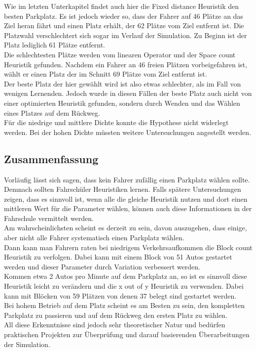 Wie im letzten Unterkapitel findet auch hier die Fixed distance Heuristik den besten Parkplatz.
Es ist jedoch wieder so, dass der Fahrer auf 46 Plätze an das Ziel heran fährt und einen Platz erhält, der 62 Plätze vom Ziel entfernt ist. Die Platzwahl verschlechtert sich sogar im Verlauf der Simulation. Zu Beginn ist der Platz lediglich 61 Plätze entfernt.\\
Die schlechtesten Plätze werden vom linearen Operator %
und der Space count Heuristik gefunden.
Nachdem ein Fahrer an 46 freien Plätzen vorbeigefahren ist, wählt er einen Platz der im Schnitt 69 Plätze vom Ziel entfernt ist.\\

Der beste Platz der hier gewählt wird ist also etwas schlechter, als im Fall von wenigen Lernenden. Jedoch wurde in diesen Fällen der beste Platz auch nicht von einer optimierten Heuristik gefunden, sondern durch Wenden und das Wählen eines Platzes auf dem Rückweg.\\
Für die niedrige und mittlere Dichte konnte die Hypothese nicht widerlegt werden. Bei der hohen Dichte müssten weitere Untersuchungen angestellt werden.

\subsection{Zusammenfassung}

Vorläufig lässt sich sagen, dass kein Fahrer zufällig einen Parkplatz wählen sollte. Demnach sollten Fahrschüler Heuristiken lernen. Falls spätere Untersuchungen zeigen, dass es sinnvoll ist, wenn alle die gleiche Heuristik nutzen und dort einen mittleren Wert für die Parameter wählen, können auch diese Informationen in der Fahrschule vermittelt werden.\\
Am wahrscheinlichsten scheint es derzeit zu sein, davon auszugehen, dass einige, aber nicht alle Fahrer systematisch einen Parkplatz wählen. \\
 Dann kann man Fahrern raten bei niedrigem Verkehrsaufkommen die Block count Heuristik zu verfolgen. Dabei kann mit einem Block von 51 Autos gestartet werden und dieser Parameter durch Variation verbessert werden.\\
 Kommen etwa 2 Autos pro Minute auf dem Parkplatz an, so ist es sinnvoll diese Heuristik leicht zu verändern und die x out of y Heuristik zu verwenden. Dabei kann mit Blöcken von 59 Plätzen von denen 37 belegt sind gestartet werden.\\
 Bei hohem Betrieb auf dem Platz scheint es am Besten zu sein, den kompletten Parkplatz zu passieren und auf dem Rückweg den ersten Platz zu wählen.\\
All diese Erkenntnisse sind jedoch sehr theoretischer Natur und bedürfen praktischen Projekten zur Überprüfung und darauf basierenden Überarbeitungen der Simulation. 
 
